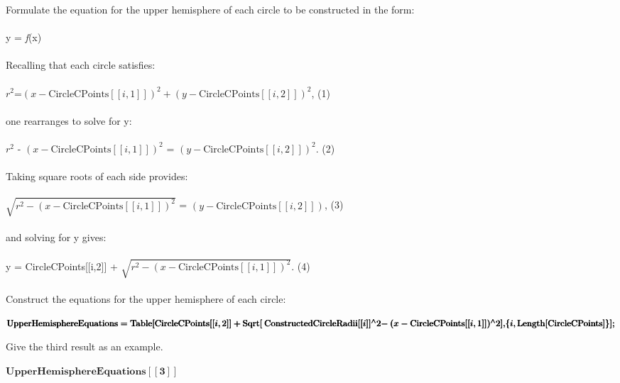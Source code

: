 \documentclass{article}
\newcommand{\unicode}[1]{{}}
\begin{document}
Formulate the equation for the upper hemisphere of each circle to be constructed in the form: \\
\\
y = \textit{ f}(x)\\
\\
Recalling that each circle satisfies:\\
\\
\(r^2\)=\((x-\text{CircleCPoints}[[i,1]])^2+ (y-\text{CircleCPoints}[[i,2]])^2\), { } { } (1)\\
\\
one rearranges to solve for y: \\
\\
\(r^2\) - \((x-\text{CircleCPoints}[[i,1]])^2\) = \((y-\text{CircleCPoints}[[i,2]])^2\). { } { } (2)\\
\\
Taking square roots of each side provides:\\
\\
$\unicode{0003}$\(\sqrt{\unicode{0016}r^2-(x-\text{CircleCPoints}[[i,1]])^2 }\) = \((y-\text{CircleCPoints}[[i,2]])\), { } { } (3)\\
\\
and solving for y gives:\\
\\
y = CircleCPoints[[i,2]] + \(\sqrt{\unicode{0016}r^2-(x-\text{CircleCPoints}[[i,1]])^2 }\). { } { }(4)\\
\\
Construct the equations for the upper hemisphere of each circle:

\begin{doublespace}
\noindent\(\pmb{\text{UpperHemisphereEquations} = \text{Table}[}\\
\pmb{\text{CircleCPoints}[[i,2]] + \text{Sqrt}[}\\
\pmb{\text{ConstructedCircleRadii}[[i]]{}^{\wedge}2 - }\\
\pmb{(x - \text{CircleCPoints}[[i,1]]){}^{\wedge}2}\\
\pmb{],}\\
\pmb{\{i, \text{Length}[\text{CircleCPoints}]\}}\\
\pmb{];}\)
\end{doublespace}

Give the third result as an example. 

\begin{doublespace}
\noindent\(\pmb{\text{UpperHemisphereEquations}[[3]]}\)
\end{doublespace}
\end{document}
